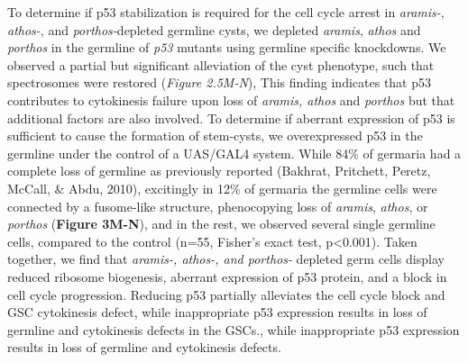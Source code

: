 \documentclass[12pt,oneside]{reedthesis}
\begin{document}
To determine if p53 stabilization is required for the cell cycle arrest in \emph{aramis-}, \emph{athos-}, and \emph{porthos-}depleted germline cysts, we depleted \emph{aramis}, \emph{athos} and \emph{porthos} in the germline of \emph{p53} mutants using germline specific knockdowns. We observed a partial but significant alleviation of the cyst phenotype, such that spectrosomes were restored (\emph{Figure 2.5M-N}), This finding indicates that p53 contributes to cytokinesis failure upon loss of \emph{aramis, athos} and \emph{porthos} but that additional factors are also involved. To determine if aberrant expression of p53 is sufficient to cause the formation of stem-cysts, we overexpressed p53 in the germline under the control of a UAS/GAL4 system. While 84\% of germaria had a complete loss of germline as previously reported (Bakhrat, Pritchett, Peretz, McCall, \& Abdu, 2010), excitingly in 12\% of germaria the germline cells were connected by a fusome-like structure, phenocopying loss of \emph{aramis}, \emph{athos}, or \emph{porthos} (\textbf{Figure 3M-N}), and in the rest, we observed several single germline cells, compared to the control (n=55, Fisher's exact test, p\textless0.001). Taken together, we find that \emph{aramis-, athos-, and porthos-} depleted germ cells display reduced ribosome biogenesis, aberrant expression of p53 protein, and a block in cell cycle progression. Reducing p53 partially alleviates the cell cycle block and GSC cytokinesis defect, while inappropriate p53 expression results in loss of germline and cytokinesis defects in the GSCs., while inappropriate p53 expression results in loss of germline and cytokinesis defects.
\end{document}
